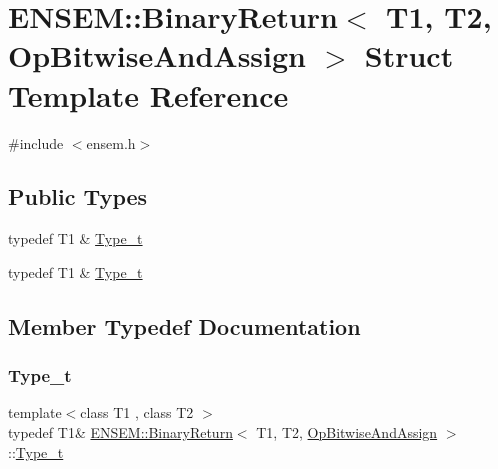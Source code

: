 \hypertarget{structENSEM_1_1BinaryReturn_3_01T1_00_01T2_00_01OpBitwiseAndAssign_01_4}{}\section{E\+N\+S\+EM\+:\+:Binary\+Return$<$ T1, T2, Op\+Bitwise\+And\+Assign $>$ Struct Template Reference}
\label{structENSEM_1_1BinaryReturn_3_01T1_00_01T2_00_01OpBitwiseAndAssign_01_4}


{\ttfamily \#include $<$ensem.\+h$>$}

\subsection*{Public Types}
\begin{DoxyCompactItemize}
\item 
typedef T1 \& \mbox{\hyperlink{structENSEM_1_1BinaryReturn_3_01T1_00_01T2_00_01OpBitwiseAndAssign_01_4_a89c578dd7fb24880911d984649901627}{Type\+\_\+t}}
\item 
typedef T1 \& \mbox{\hyperlink{structENSEM_1_1BinaryReturn_3_01T1_00_01T2_00_01OpBitwiseAndAssign_01_4_a89c578dd7fb24880911d984649901627}{Type\+\_\+t}}
\end{DoxyCompactItemize}


\subsection{Member Typedef Documentation}
\mbox{\label{structENSEM_1_1BinaryReturn_3_01T1_00_01T2_00_01OpBitwiseAndAssign_01_4_a89c578dd7fb24880911d984649901627}} 
\subsubsection{\texorpdfstring{Type\_t}{Type\_t}\hspace{0.1cm}{\footnotesize\ttfamily [1/2]}}
{\footnotesize\ttfamily template$<$class T1 , class T2 $>$ \\
typedef T1\& \mbox{\hyperlink{structENSEM_1_1BinaryReturn}{E\+N\+S\+E\+M\+::\+Binary\+Return}}$<$ T1, T2, \mbox{\hyperlink{structENSEM_1_1OpBitwiseAndAssign}{Op\+Bitwise\+And\+Assign}} $>$\+::\mbox{\hyperlink{structENSEM_1_1BinaryReturn_3_01T1_00_01T2_00_01OpBitwiseAndAssign_01_4_a89c578dd7fb24880911d984649901627}{Type\+\_\+t}}}

